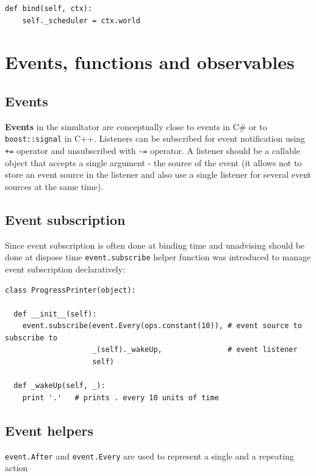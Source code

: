 \documentclass[a4paper,11pt]{article}
\begin{document}
\begin{verbatim}
def bind(self, ctx):
    self._scheduler = ctx.world
\end{verbatim}


\section{Events, functions and
observables}\label{events-functions-and-observables}

\subsection{Events}\label{events}
\textbf{Events} in the simultator are conceptually close to events in
C\# or to \texttt{boost::signal} in C++. Listeners can be
subscribed for event notification using \texttt{+=} operator and
unsubscribed with \texttt{-=} operator. A listener should be a callable
object that accepts a single argument - the source of the event (it
allows not to store an event source in the listener and also use a
single listener for several event sources at the same time).

\subsection{Event subscription}\label{event-subscription}

Since event subscription is often done at binding time and unadvising
should be done at dispose time \texttt{event.subscribe} helper function
was introduced to manage event subscription declaratively:

\begin{verbatim}
class ProgressPrinter(object):

  def __init__(self):
    event.subscribe(event.Every(ops.constant(10)), # event source to subscribe to
                    _(self)._wakeUp,               # event listener
                    self)

  def _wakeUp(self, _):
    print '.'   # prints . every 10 units of time
\end{verbatim}

\subsection{Event helpers}\label{event-helpers}

\texttt{event.After} and \texttt{event.Every} are used to represent a
single and a repeating action
\end{document}
